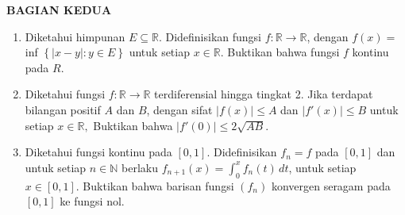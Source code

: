 \documentclass[12pt,twoside]{article}
\begin{document}
\newpage \textbf{BAGIAN KEDUA}
\begin{enumerate}
	\item Diketahui himpunan $E \subseteq \mathbb{R}.$ Didefinisikan fungsi $f : \mathbb{R} \to \mathbb{R}$, dengan $f(x) = $ inf $\left\lbrace |x-y| : y \in E \right\rbrace$ untuk setiap $x \in \mathbb{R}. $ Buktikan bahwa fungsi $f$ kontinu pada $R$.

	\item Diketahui fungsi $f : \mathbb{R} \to \mathbb{R}$ terdiferensial hingga tingkat 2. Jika terdapat bilangan positif $A$ dan $B$, dengan sifat $|f(x)| \leq A$ dan $|f'(x)| \leq B$ untuk setiap $x \in \mathbb{R}, $ Buktikan bahwa $|f'(0)| \leq 2\sqrt{AB}$.

	\item Diketahui fungsi kontinu pada $[0,1]$. Didefinisikan $f_n = f$ pada $[0,1]$ dan untuk setiap $n \in \mathbb{N}$ berlaku $f_{n+1}(x) = \int_{0}^{x} f_n(t)\,dt$, untuk setiap $x  \in [0,1]$. Buktikan bahwa barisan fungsi $(f_n)$ konvergen seragam pada $[0,1]$ ke fungsi nol.
\end{enumerate}

\pagebreak
\end{document}
